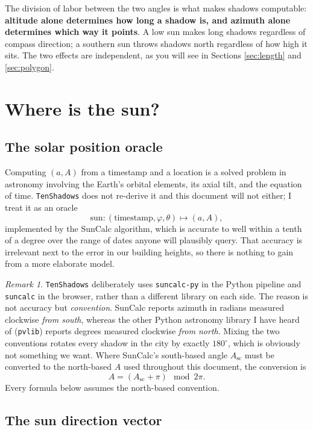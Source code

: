 \documentclass[11pt,a4paper]{article}
\theoremstyle{plain}
\theoremstyle{definition}
\theoremstyle{remark}
\newtheorem{remark}{Remark}
\begin{document}
The division of labor between the two angles is what makes shadows computable: \textbf{altitude alone determines how long a shadow is, and azimuth alone determines which way it points}. A low sun makes long shadows regardless of compass direction; a southern sun throws shadows north regardless of how high it sits. The two effects are independent, as you will see in Sections \ref{sec:length} and \ref{sec:polygon}.

\section{Where is the sun?}
\label{sec:sun}

\subsection{The solar position oracle}

Computing $(a, A)$ from a timestamp and a location is a solved problem in astronomy involving the Earth's orbital elements, its axial tilt, and the equation of time. \texttt{TenShadows} does not re-derive it and this document will not either; I treat it as an oracle
$$\mathrm{sun}: (\text{timestamp}, \varphi, \theta) \longmapsto (a, A),$$
implemented by the SunCalc algorithm, which is accurate to well within a tenth of a degree over the range of dates anyone will plausibly query. That accuracy is irrelevant next to the error in our building heights, so there is nothing to gain from a more elaborate model.

\begin{remark}
\label{rem:convention}
\texttt{TenShadows} deliberately uses \texttt{suncalc-py} in the Python pipeline and \texttt{suncalc} in the browser, rather than a different library on each side. The reason is not accuracy but \emph{convention}. SunCalc reports azimuth in radians measured clockwise \emph{from south}, whereas the other Python astronomy library I have heard of (\texttt{pvlib}) reports degrees measured clockwise \emph{from north}. Mixing the two conventions rotates every shadow in the city by exactly $180^\circ$, which is obviously not something we want. Where SunCalc's south-based angle $A_{\mathrm{sc}}$ must be converted to the north-based $A$ used throughout this document, the conversion is
$$A = (A_{\mathrm{sc}} + \pi) \mod{2\pi}.$$
Every formula below assumes the north-based convention.
\end{remark}

\subsection{The sun direction vector}
\end{document}

